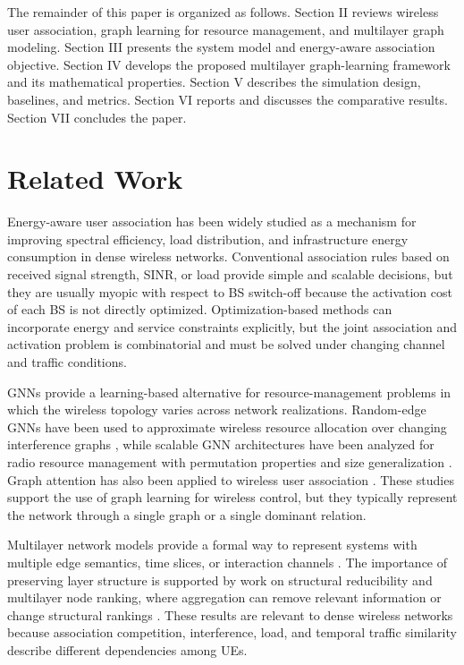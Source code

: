 \documentclass[journal]{IEEEtran}
\begin{document}
The remainder of this paper is organized as follows. Section II reviews
wireless user association, graph learning for resource management, and
multilayer graph modeling. Section III presents the system model and
energy-aware association objective. Section IV develops the proposed multilayer
graph-learning framework and its mathematical properties. Section V describes
the simulation design, baselines, and metrics. Section VI reports and discusses
the comparative results. Section VII concludes the paper.

\section{Related Work}
Energy-aware user association has been widely studied as a mechanism for
improving spectral efficiency, load distribution, and infrastructure energy
consumption in dense wireless networks. Conventional association rules based on
received signal strength, SINR, or load provide simple and scalable decisions,
but they are usually myopic with respect to BS switch-off because the
activation cost of each BS is not directly optimized. Optimization-based
methods can incorporate energy and service constraints explicitly, but the
joint association and activation problem is combinatorial and must be solved
under changing channel and traffic conditions.

GNNs provide a learning-based alternative for resource-management problems in
which the wireless topology varies across network realizations. Random-edge
GNNs have been used to approximate wireless resource allocation over changing
interference graphs \cite{eisen2020optimal}, while scalable GNN architectures
have been analyzed for radio resource management with permutation properties
and size generalization \cite{shen2021scalable}. Graph attention has also been
applied to wireless user association \cite{mirzaei2025gatua}. These studies
support the use of graph learning for wireless control, but they typically
represent the network through a single graph or a single dominant relation.

Multilayer network models provide a formal way to represent systems with
multiple edge semantics, time slices, or interaction channels
\cite{kivela2014multilayer,dedomenico2013mathematical,boccaletti2014structure}.
The importance of preserving layer structure is supported by work on structural
reducibility and multilayer node ranking, where aggregation can remove relevant
information or change structural rankings
\cite{dedomenico2015reducibility,dedomenico2015versatile}. These results are
relevant to dense wireless networks because association competition,
interference, load, and temporal traffic similarity describe different
dependencies among UEs.
\end{document}
